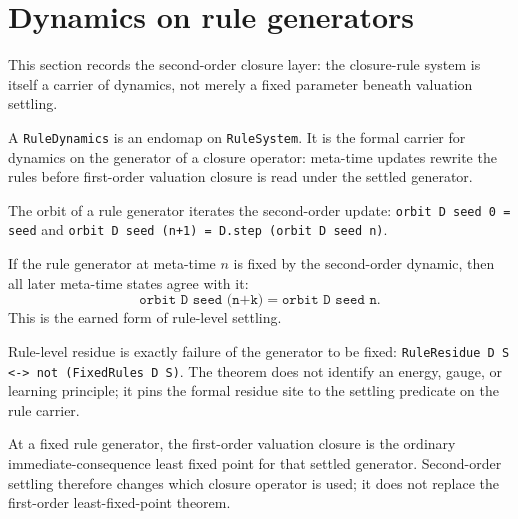 \section{Dynamics on rule generators}

This section records the second-order closure layer: the closure-rule system is
itself a carrier of dynamics, not merely a fixed parameter beneath valuation
settling.

\begin{proposition}\label{thm:rule-dynamics}\leanok{}
A \texttt{RuleDynamics} is an endomap on \texttt{RuleSystem}. It is the formal
carrier for dynamics on the generator of a closure operator: meta-time updates
rewrite the rules before first-order valuation closure is read under the settled
generator.
\end{proposition}

\begin{proposition}\label{thm:rule-dynamics-orbit}\leanok{}
The orbit of a rule generator iterates the second-order update:
\texttt{orbit D seed 0 = seed} and
\texttt{orbit D seed (n+1) = D.step (orbit D seed n)}.
\end{proposition}

\begin{theorem}\label{thm:fixed-rule-orbit-add}\leanok{}
If the rule generator at meta-time $n$ is fixed by the second-order dynamic, then
all later meta-time states agree with it:
\[
  \texttt{orbit D seed (n+k)} = \texttt{orbit D seed n}.
\]
This is the earned form of rule-level settling.
\end{theorem}

\begin{theorem}\label{thm:rule-residue-iff-not-fixed}\leanok{}
Rule-level residue is exactly failure of the generator to be fixed:
\texttt{RuleResidue D S <-> not (FixedRules D S)}. The theorem does not identify
an energy, gauge, or learning principle; it pins the formal residue site to the
settling predicate on the rule carrier.
\end{theorem}

\begin{theorem}\label{thm:settled-rules-closure-lfp}\leanok{}
At a fixed rule generator, the first-order valuation closure is the ordinary
immediate-consequence least fixed point for that settled generator. Second-order
settling therefore changes which closure operator is used; it does not replace
the first-order least-fixed-point theorem.
\end{theorem}

